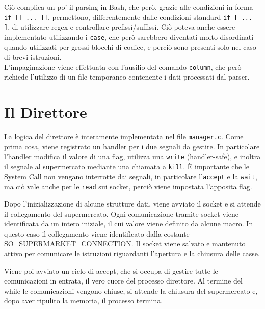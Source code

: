 \documentclass[a4paper,11pt,twoside] {article}
\begin{document}


Ciò complica un po' il parsing in Bash, che però, grazie alle condizioni in forma \lstinline{if [[ ... ]]}, permettono, differentemente dalle condizioni standard \lstinline{if [ ... ]}, di utilizzare regex e controllare prefissi/suffissi. Ciò poteva anche essere implementato utilizzando i \lstinline{case}, che però sarebbero diventati molto disordinati quando utilizzati per grossi blocchi di codice, e perciò sono presenti solo nel caso di brevi istruzioni.\\
L'impaginazione viene effettuata con l'ausilio del comando \lstinline{column}, che però richiede l'utilizzo di un file temporaneo contenente i dati processati dal parser.

\section*{Il Direttore}

La logica del direttore è interamente implementata nel file \lstinline{manager.c}. Come prima cosa, viene registrato un handler per i due segnali da gestire. In particolare l'handler modifica il valore di una flag, utilizza una \lstinline{write} (handler-safe), e inoltra il segnale al supermercato mediante una chiamata a \lstinline{kill}. È importante che le System Call non vengano interrotte dai segnali, in particolare l'\lstinline{accept} e la \lstinline{wait}, ma ciò vale anche per le \lstinline{read} sui socket, perciò viene impostata l'apposita flag.

Dopo l'inizializzazione di alcune strutture dati, viene avviato il socket e si attende il collegamento del supermercato. Ogni comunicazione tramite socket viene identificata da un intero iniziale, il cui valore viene definito da alcune macro. In questo caso il collegamento viene identificato dalla costante SO\_SUPERMARKET\_CONNECTION. Il socket viene salvato e mantenuto attivo per comunicare le istruzioni riguardanti l'apertura e la chiusura delle casse.

Viene poi avviato un ciclo di accept, che si occupa di gestire tutte le comunicazioni in entrata, il vero cuore del processo direttore. Al termine del while le comunicazioni vengono chiuse, si attende la chiusura del supermercato e, dopo aver ripulito la memoria, il processo termina.
\end{document}

